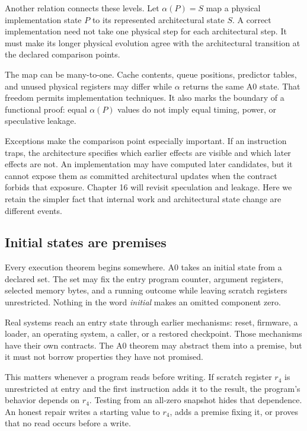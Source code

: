 Another relation connects these levels. Let \(\alpha(P)=S\) map a physical
implementation state \(P\) to its represented architectural state \(S\). A
correct implementation need not take one physical step for each architectural
step. It must make its longer physical evolution agree with the architectural
transition at the declared comparison points.

The map can be many-to-one. Cache contents, queue positions, predictor tables,
and unused physical registers may differ while \(\alpha\) returns the same A0
state. That freedom permits implementation techniques. It also marks the
boundary of a functional proof: equal \(\alpha(P)\) values do not imply equal
timing, power, or speculative leakage.

Exceptions make the comparison point especially important. If an instruction
traps, the architecture specifies which earlier effects are visible and which
later effects are not. An implementation may have computed later candidates,
but it cannot expose them as committed architectural updates when the contract
forbids that exposure. Chapter 16 will revisit speculation and leakage. Here
we retain the simpler fact that internal work and architectural state change
are different events.

\subsection{Initial states are premises}

Every execution theorem begins somewhere. A0 takes an initial state from a
declared set. The set may fix the entry program counter, argument registers,
selected memory bytes, and a running outcome while leaving scratch registers
unrestricted. Nothing in the word \emph{initial} makes an omitted component
zero.

Real systems reach an entry state through earlier mechanisms: reset, firmware,
a loader, an operating system, a caller, or a restored checkpoint. Those
mechanisms have their own contracts. The A0 theorem may abstract them into a
premise, but it must not borrow properties they have not promised.

This matters whenever a program reads before writing. If scratch register
\(r_4\) is unrestricted at entry and the first instruction adds it to the
result, the program's behavior depends on \(r_4\). Testing from an all-zero
snapshot hides that dependence. An honest repair writes a starting value to \(r_4\), adds a
premise fixing it, or proves that no read occurs before a write.


